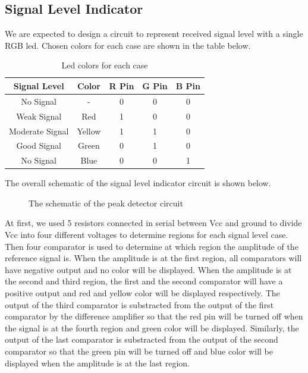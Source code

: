 \documentclass[conference]{IEEEtran}
\begin{document}
\subsection{Signal Level Indicator}
We are expected to design a circuit to represent received signal level with a single RGB led. Chosen colors for 
each case are shown in the table below.
\begin{table}[htbp]
    \caption{Led colors for each case}
    \begin{center}
    \begin{tabular}{|c|c|c|c|c|}
    \hline
    \textbf{Signal Level} & \textbf{Color}& \textbf{R Pin}& \textbf{G Pin}& \textbf{B Pin} \\
    \hline
    No Signal & - & 0 & 0 & 0\\
    \hline
    Weak Signal & Red & 1 & 0 & 0\\
    \hline
    Moderate Signal & Yellow & 1 & 1 & 0\\
    \hline
    Good Signal & Green & 0 & 1 & 0\\
    \hline
    No Signal & Blue & 0 & 0 & 1\\
    \hline
    \end{tabular}
    \label{tab1}
    \end{center}
\end{table}
\par The overall schematic of the signal level indicator circuit is shown below.
\begin{figure}[H]
   \centerline{}
    \caption{The schematic of the peak detector circuit}
\end{figure}
\par At first, we used 5 resistors connected in serial between Vcc and ground to divide Vcc into four different voltages 
to determine regions for each signal level case. 
Then four comparator is used to determine at which region the amplitude of the reference signal is. When the amplitude 
is at the first region, all comparators will have negative output and no color will be displayed. When the amplitude 
is at the second and third region, the first and the second comparator will have a positive output and red and yellow 
color will be displayed respectively. The output of the third comparator is substracted from the output of the first 
comparator by the difference amplifier so that the red pin will be turned off when the signal is at the fourth region 
and green color will be displayed. Similarly, the output of the last comparator is substracted from the output of the 
second comparator so that the green pin will be turned off and blue color will be displayed when the amplitude is at the 
last region.
\end{document}
